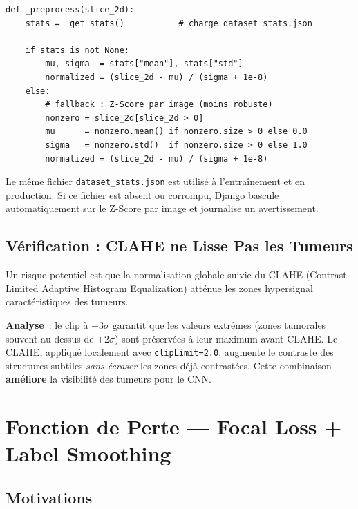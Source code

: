 \documentclass[12pt, a4paper]{report}
\newcommand{\code}[1]{\texttt{\small #1}}
\newcommand{\fichier}[1]{\texttt{\small\color{blue!70!black}#1}}
\begin{document}
\begin{lstlisting}[caption={Z-Score dataset dans views.py (inférence)},
                   label={lst:zscore_infer}]
def _preprocess(slice_2d):
    stats = _get_stats()           # charge dataset_stats.json

    if stats is not None:
        mu, sigma  = stats["mean"], stats["std"]
        normalized = (slice_2d - mu) / (sigma + 1e-8)
    else:
        # fallback : Z-Score par image (moins robuste)
        nonzero = slice_2d[slice_2d > 0]
        mu      = nonzero.mean() if nonzero.size > 0 else 0.0
        sigma   = nonzero.std()  if nonzero.size > 0 else 1.0
        normalized = (slice_2d - mu) / (sigma + 1e-8)
\end{lstlisting}

\begin{infobox}
  Le même fichier \fichier{dataset\_stats.json} est utilisé à
  l'entraînement et en production. Si ce fichier est absent ou
  corrompu, Django bascule automatiquement sur le Z-Score par image
  et journalise un avertissement.
\end{infobox}

\subsection{Vérification : CLAHE ne Lisse Pas les Tumeurs}

Un risque potentiel est que la normalisation globale suivie du CLAHE
(Contrast Limited Adaptive Histogram Equalization) atténue les zones
hypersignal caractéristiques des tumeurs.

\textbf{Analyse}~: le clip à \(\pm 3\sigma\) garantit que les valeurs
extrêmes (zones tumorales souvent au-dessus de \(+2\sigma\)) sont
préservées à leur maximum avant CLAHE. Le CLAHE, appliqué localement
avec \code{clipLimit=2.0}, augmente le contraste des structures subtiles
\textit{sans écraser} les zones déjà contrastées. Cette combinaison
\textbf{améliore} la visibilité des tumeurs pour le CNN.

\section{Fonction de Perte — Focal Loss + Label Smoothing}
\label{sec:loss}

\subsection{Motivations}
\end{document}
